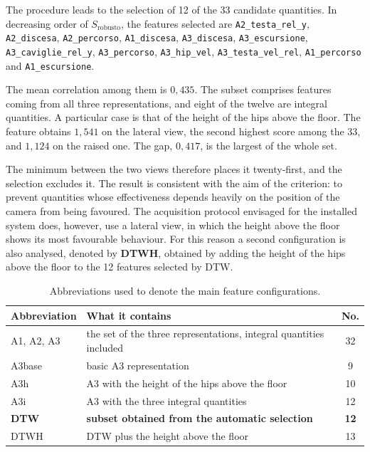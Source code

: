 The procedure leads to the selection of 12 of the 33 candidate quantities. In decreasing order of $S_{\mathrm{robusto}}$, the features selected are
\texttt{A2\_testa\_rel\_y}, \texttt{A2\_discesa},
\texttt{A2\_percorso}, \texttt{A1\_discesa}, \texttt{A3\_discesa},
\texttt{A3\_escursione}, \texttt{A3\_caviglie\_rel\_y}, \texttt{A3\_percorso},
\texttt{A3\_hip\_vel}, \texttt{A3\_testa\_vel\_rel}, \texttt{A1\_percorso} and
\texttt{A1\_escursione}.

The mean correlation among them is \(0{,}435\). The subset comprises features coming from all three representations, and eight of the twelve are integral quantities. A particular case is that of the height of the hips above the floor. The feature obtains \(1{,}541\) on the lateral view, the second highest score among the 33, and \(1{,}124\) on the raised one. The gap, \(0{,}417\), is the largest of the whole set.

The minimum between the two views therefore places it twenty-first, and the selection excludes it. The result is consistent with the aim of the criterion: to prevent quantities whose effectiveness depends heavily on the position of the camera from being favoured. The acquisition protocol envisaged for the installed system does, however, use a lateral view, in which the height above the floor shows its most favourable behaviour. For this reason a second configuration is also analysed, denoted by \textbf{DTWH}, obtained by adding the height of the hips above the floor to the 12 features selected by DTW.

\begin{table}[htbp]
\centering
\caption{Abbreviations used to denote the main feature configurations.}
\label{tab:sigle}
\begin{tabular}{@{}llc@{}}
\toprule
\textbf{Abbreviation} & \textbf{What it contains} & \textbf{No.} \\
\midrule
A1, A2, A3 & the set of the three representations, integral quantities included & 32 \\
A3base & basic A3 representation & 9 \\
A3h & A3 with the height of the hips above the floor & 10 \\
A3i & A3 with the three integral quantities & 12 \\
\textbf{DTW} & \textbf{subset obtained from the automatic selection} & \textbf{12} \\
DTWH & DTW plus the height above the floor & 13 \\
\bottomrule
\end{tabular}
\end{table}

